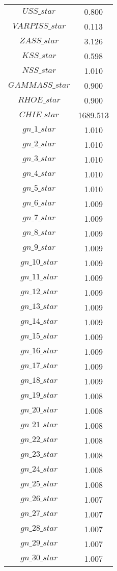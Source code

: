 \begin{center}
\begin{longtable}{cc}
$USS\_star$ 	 & 	 0.800 \\
$VARPISS\_star$ 	 & 	 0.113 \\
$ZASS\_star$ 	 & 	 3.126 \\
$KSS\_star$ 	 & 	 0.598 \\
$NSS\_star$ 	 & 	 1.010 \\
$GAMMASS\_star$ 	 & 	 0.900 \\
$RHOE\_star$ 	 & 	 0.900 \\
$CHIE\_star$ 	 & 	 1689.513 \\
$gn\_1\_star$ 	 & 	 1.010 \\
$gn\_2\_star$ 	 & 	 1.010 \\
$gn\_3\_star$ 	 & 	 1.010 \\
$gn\_4\_star$ 	 & 	 1.010 \\
$gn\_5\_star$ 	 & 	 1.010 \\
$gn\_6\_star$ 	 & 	 1.009 \\
$gn\_7\_star$ 	 & 	 1.009 \\
$gn\_8\_star$ 	 & 	 1.009 \\
$gn\_9\_star$ 	 & 	 1.009 \\
$gn\_10\_star$ 	 & 	 1.009 \\
$gn\_11\_star$ 	 & 	 1.009 \\
$gn\_12\_star$ 	 & 	 1.009 \\
$gn\_13\_star$ 	 & 	 1.009 \\
$gn\_14\_star$ 	 & 	 1.009 \\
$gn\_15\_star$ 	 & 	 1.009 \\
$gn\_16\_star$ 	 & 	 1.009 \\
$gn\_17\_star$ 	 & 	 1.009 \\
$gn\_18\_star$ 	 & 	 1.009 \\
$gn\_19\_star$ 	 & 	 1.008 \\
$gn\_20\_star$ 	 & 	 1.008 \\
$gn\_21\_star$ 	 & 	 1.008 \\
$gn\_22\_star$ 	 & 	 1.008 \\
$gn\_23\_star$ 	 & 	 1.008 \\
$gn\_24\_star$ 	 & 	 1.008 \\
$gn\_25\_star$ 	 & 	 1.008 \\
$gn\_26\_star$ 	 & 	 1.007 \\
$gn\_27\_star$ 	 & 	 1.007 \\
$gn\_28\_star$ 	 & 	 1.007 \\
$gn\_29\_star$ 	 & 	 1.007 \\
$gn\_30\_star$ 	 & 	 1.007 \\

\end{longtable}
\end{center}
